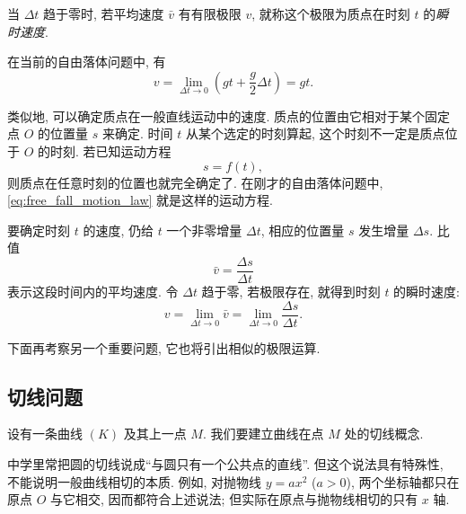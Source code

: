 {\kaishu 当 $\Delta t$ 趋于零时, 若平均速度 $\bar v$ 有有限极限 $v$,
就称这个极限为质点在时刻 $t$ 的\emph{瞬时速度}.}

在当前的自由落体问题中, 有
$$
v=\lim_{\Delta t\to0}\left(gt+\frac g2\Delta t\right)=gt.
$$

类似地, 可以确定质点在一般直线运动中的速度.
质点的位置由它相对于某个固定点 $O$ 的位置量 $s$ 来确定.
时间 $t$ 从某个选定的时刻算起,
这个时刻不一定是质点位于 $O$ 的时刻.
若已知运动方程
$$
s=f(t),
$$
则质点在任意时刻的位置也就完全确定了.
在刚才的自由落体问题中, \eqref{eq:free_fall_motion_law} 就是这样的运动方程.

要确定时刻 $t$ 的速度, 仍给 $t$ 一个非零增量 $\Delta t$,
相应的位置量 $s$ 发生增量 $\Delta s$.
比值
$$
\bar v=\frac{\Delta s}{\Delta t}
$$
表示这段时间内的平均速度.
令 $\Delta t$ 趋于零, 若极限存在, 就得到时刻 $t$ 的瞬时速度:
$$
v=\lim_{\Delta t\to0}\bar v
=\lim_{\Delta t\to0}\frac{\Delta s}{\Delta t}.
$$

下面再考察另一个重要问题, 它也将引出相似的极限运算.

\subsection{切线问题}\label{subsec:91}
设有一条曲线 $(K)$ 及其上一点 $M$.
我们要建立曲线在点 $M$ 处的切线概念.

\begin{figure}
    \vspace{-0.5cm}
    \centering
    \label{fig:tangent_as_secant_limit}
\end{figure}
中学里常把圆的切线说成“与圆只有一个公共点的直线”.
但这个说法具有特殊性, 不能说明一般曲线相切的本质.
例如, 对抛物线 $y=ax^2$ ($a>0$), 两个坐标轴都只在原点 $O$ 与它相交,
因而都符合上述说法; 但实际在原点与抛物线相切的只有 $x$ 轴.

